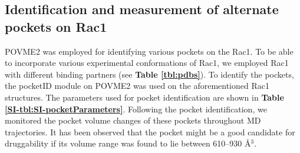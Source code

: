 \documentclass[12pt,a4paper]{achemso}
\begin{document}
\subsection{Identification and measurement of alternate pockets on Rac1} 
    POVME2 \cite{durrant2011povme, durrant2014povme} was employed for identifying various pockets on the Rac1. To be able to incorporate various experimental conformations of Rac1, we employed Rac1 with different binding partners (see \textbf{Table \ref{tbl:pdbs}}). To identify the pockets, the pocketID module on POVME2 was used on the aforementioned Rac1 structures. The parameters used for pocket identification are shown in \textbf{Table \ref{SI-tbl:SI-pocketParameters}}. Following the pocket identification, we monitored the pocket volume changes of these pockets throughout MD trajectories. It has been observed that the pocket might be a good candidate for druggability if its volume range was found to lie between 610--930 \r{A}$^3$\cite{perot2010druggable, nayal2006nature, an2005pocketome}.
\end{document}
